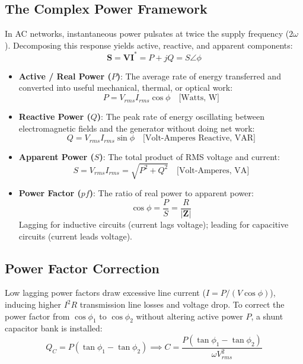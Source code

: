 \subsection{The Complex Power Framework}
In AC networks, instantaneous power pulsates at twice the supply frequency ($2\omega$). Decomposing this response yields active, reactive, and apparent components:
\begin{equation}
\mathbf{S} = \mathbf{V}\mathbf{I}^* = P + jQ = S \angle \phi
\end{equation}
\begin{itemize}[leftmargin=1.5em]
    \item \textbf{Active / Real Power ($P$)}: The average rate of energy transferred and converted into useful mechanical, thermal, or optical work:
    \begin{equation}
    P = V_{rms} I_{rms} \cos\phi \quad \text{[Watts, W]}
    \end{equation}
    \item \textbf{Reactive Power ($Q$)}: The peak rate of energy oscillating between electromagnetic fields and the generator without doing net work:
    \begin{equation}
    Q = V_{rms} I_{rms} \sin\phi \quad \text{[Volt-Amperes Reactive, VAR]}
    \end{equation}
    \item \textbf{Apparent Power ($S$)}: The total product of RMS voltage and current:
    \begin{equation}
    S = V_{rms} I_{rms} = \sqrt{P^2 + Q^2} \quad \text{[Volt-Amperes, VA]}
    \end{equation}
    \item \textbf{Power Factor ($pf$)}: The ratio of real power to apparent power:
    \begin{equation}
    \cos\phi = \frac{P}{S} = \frac{R}{|\mathbf{Z}|}
    \end{equation}
    Lagging for inductive circuits (current lags voltage); leading for capacitive circuits (current leads voltage).
\end{itemize}

\subsection{Power Factor Correction}
Low lagging power factors draw excessive line current ($I = P / (V \cos\phi)$), inducing higher $I^2 R$ transmission line losses and voltage drop. To correct the power factor from $\cos\phi_1$ to $\cos\phi_2$ without altering active power $P$, a shunt capacitor bank is installed:
\begin{equation}
Q_C = P(\tan\phi_1 - \tan\phi_2) \implies C = \frac{P(\tan\phi_1 - \tan\phi_2)}{\omega V_{rms}^2}
\end{equation}

